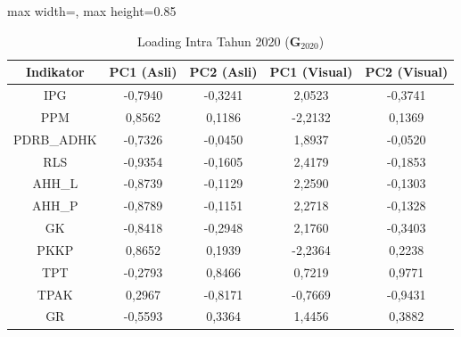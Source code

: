 \begin{table}[H]
\centering
\caption{Loading Intra Tahun 2020 ($\mathbf{G}_{2020}$)} \label{tab:app2loading_intra_2020}
\begin{adjustbox}{max width=\textwidth, max height=0.85\textheight}
\begin{tabular}{|c|c|c|c|c|}
\hline
\textbf{Indikator} & \textbf{PC1 (Asli)} & \textbf{PC2 (Asli)} & \textbf{PC1 (Visual)} & \textbf{PC2 (Visual)} \\
\hline
IPG & -0,7940 & -0,3241 & 2,0523 & -0,3741 \\
PPM & 0,8562 & 0,1186 & -2,2132 & 0,1369 \\
PDRB\_ADHK & -0,7326 & -0,0450 & 1,8937 & -0,0520 \\
RLS & -0,9354 & -0,1605 & 2,4179 & -0,1853 \\
AHH\_L & -0,8739 & -0,1129 & 2,2590 & -0,1303 \\
AHH\_P & -0,8789 & -0,1151 & 2,2718 & -0,1328 \\
GK & -0,8418 & -0,2948 & 2,1760 & -0,3403 \\
PKKP & 0,8652 & 0,1939 & -2,2364 & 0,2238 \\
TPT & -0,2793 & 0,8466 & 0,7219 & 0,9771 \\
TPAK & 0,2967 & -0,8171 & -0,7669 & -0,9431 \\
GR & -0,5593 & 0,3364 & 1,4456 & 0,3882 \\
\hline
\end{tabular}
\end{adjustbox}
\end{table}